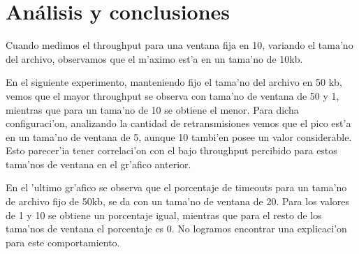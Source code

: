 \section{Análisis y conclusiones}

Cuando medimos el throughput para una ventana fija en 10, variando el tama'no del archivo, observamos que el m'aximo est'a en un tama'no de 10kb. 

En el siguiente experimento, manteniendo fijo el tama'no del archivo en 50 kb, vemos que el mayor throughput se observa con tama'no de ventana de 50 y 1, mientras que para un tama'no de 10 se obtiene el menor. Para dicha configuraci'on, analizando la cantidad de retransmisiones vemos que el pico est'a en un tama'no de ventana de 5, aunque 10 tambi'en posee un valor considerable. Esto parecer'ia tener correlaci'on con el bajo throughput percibido para estos tama'nos de ventana en el gr'afico anterior.

En el 'ultimo gr'afico se observa que el porcentaje de timeouts para un tama'no de archivo fijo de 50kb, se da con un tama'no de ventana de 20. Para los valores de 1 y 10 se obtiene un porcentaje igual, mientras que para el resto de los tama'nos de ventana el porcentaje es 0. No logramos encontrar una explicaci'on para este comportamiento. 
